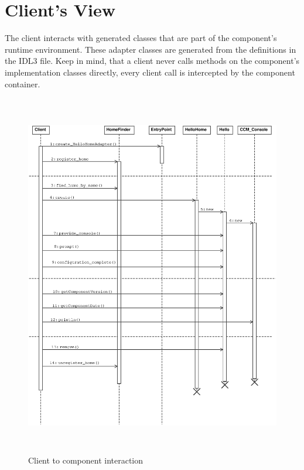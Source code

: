 \section{Client's View}

The client interacts with generated classes that are part of the component's
runtime environment. These adapter classes are generated from the definitions
in the IDL3 file.
Keep in mind, that a client never calls methods on the component's implementation
classes directly, every client call is intercepted by the component container. 

\begin{figure}[htbp]
    \begin{center}
        \includegraphics [height=16cm,angle=0] {ClientView.eps}
        \caption{Client to component interaction}
        \label{ClientView}
    \end{center}
\end{figure}

